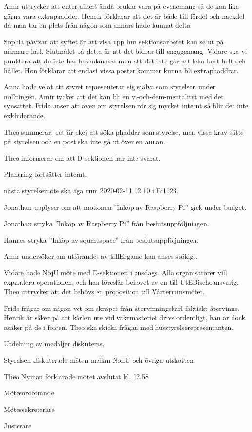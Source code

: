 \documentclass[10pt]{article}
\def\mo{Theo Nyman}
\def\ms{Hannes Björk}
\def\ji{Fredrik Berg}
\begin{document}
\begin{paragrafer}
Amir uttrycker att entertainers ändå brukar vara på evenemang så de kan lika gärna vara extraphadder. Henrik förklarar att det är både till fördel och nackdel då man tar en plats från någon som annars hade kunnat delta 

Sophia påvisar att syftet är att visa upp hur sektionsarbetet kan se ut på närmare håll. Slutmålet på detta är att det bidrar till engagemang. Vidare ska vi punktera att de inte har huvudansvar men att det inte går att leka bort helt och hållet. Hon förklarar att endast vissa poster kommer kunna bli extraphaddrar.

Anna hade velat att styret representerar sig själva som styrelsen under nollningen.
Amir tycker att det kan bli en vi-och-dem-mentalitet med det synsättet.
Frida anser att även om styrelsen rör sig mycket internt så blir det inte exkluderande.

Theo summerar; det är okej att söka phadder som styrelse, men vissa krav sätts på styrelsen och en post ska inte gå ut över en annan.


Theo informerar om att D-sektionen har inte svarat.

Planering fortsätter internt.


\Mba nästa styrelsemöte ska äga rum 2020-02-11 12.10 i E:1123.


Jonathan upplyser om att motionen ''Inköp av Raspberry Pi'' gick under budget.

Jonathan \ypa stryka ''Inköp av Raspberry Pi'' från beslutsuppföljningen.

\Mbaby 

Hannes \ypa stryka ''Inköp av squarespace'' från beslutsuppföljningen.

\Mbaby


Amir undersöker om utförandet av killErgame kan anses stökigt.

Vidare hade NöjU möte med D-sektionen i onsdags. Alla organisatörer vill expandera operationen, och han föreslår behovet av en till UtEDischoansvarig. 
Theo uttrycker att det behövs en proposition till Vårterminsmötet.


Frida frågar om någon vet om skräpet från återvinningskärl faktiskt återvinns.
Henrik är säker på att kärlen ute vid vaktmästeriet drivs ordentligt, han är dock osäker på de i foajen.
Theo ska skicka frågan med husstyrelserepresentanten.

Utdelning av medaljer diskuteras.

Styrelsen diskuterade möten mellan NollU och övriga utskotten.

{\mo} förklarade mötet avslutat kl. 12.58
\end{paragrafer}

\hidesignfoot
\begin{signatures}{3}
\signature{\mo}{Mötesordförande}
\signature{\ms}{Mötessekreterare}
\signature{\ji}{Justerare}
\end{signatures}
\end{document}
